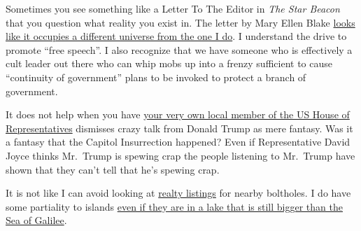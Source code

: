 Sometimes you see something like a Letter To The Editor in \emph{The
Star Beacon} that you question what reality you exist in. The letter by
Mary Ellen Blake
\href{http://web.archive.org/web/20221203090718/https://www.starbeacon.com/opinion/can-we-get-back-free-speech/article_f942402e-7262-11ed-a597-737b73d1d31f.html}{looks
like it occupies a different universe from the one I do}. I understand
the drive to promote ``free speech''. I also recognize that we have
someone who is effectively a cult leader out there who can whip mobs up
into a frenzy sufficient to cause ``continuity of government'' plans to
be invoked to protect a branch of government.

It does not help when you have
\href{https://web.archive.org/web/20221205204838/https://news.yahoo.com/gop-representative-sparks-anchor-incredulity-060126122.html}{your
very own local member of the US House of Representatives} dismisses
crazy talk from Donald Trump as mere fantasy. Was it a fantasy that the
Capitol Insurrection happened? Even if Representative David Joyce thinks
Mr.~Trump is spewing crap the people listening to Mr.~Trump have shown
that they can't tell that he's spewing crap.

It is not like I can avoid looking at
\href{https://www.realtor.ca/map\#ZoomLevel=12&Center=41.774578\%2C-82.654969&LatitudeMax=41.85301&LongitudeMax=-82.46099&LatitudeMin=41.69605&LongitudeMin=-82.84895&Sort=6-D&PropertyTypeGroupID=1&PropertySearchTypeId=0&TransactionTypeId=2&Currency=CAD}{realty
listings} for nearby boltholes. I do have some partiality to islands
\href{https://www.realtor.com/realestateandhomes-search/Ottawa-County_OH/sby-1?view=map}{even
if they are in a lake that is still bigger than the Sea of Galilee}.
